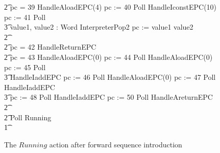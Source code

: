 \begin{figure}[tp!]
{\begin{circus}
    \t2 {} \circelse pc = 39 \circthen HandleAloadEPC(4) \circseq pc := 40 \circseq Poll \circseq HandleIconstEPC(10) \circseq  pc := 41 \circseq Poll \circseq \\
    \t3 \circvar value1, value2 : Word \circspot InterpreterPop2 \circseq pc := \IF value1 \leq value2   \\
    \t2 {} \cdots {} \\
    \t2 {} \circelse pc = 42 \circthen HandleReturnEPC \\
    \t2 {} \circelse pc = 43 \circthen HandleAloadEPC(0) \circseq pc := 44 \circseq Poll \circseq HandleAloadEPC(0) \circseq pc := 45 \circseq Poll \circseq \\
    \t3 HandleIaddEPC \circseq pc := 46 \circseq Poll \circseq HandleAloadEPC(0) \circseq pc := 47 \circseq Poll \circseq  HandleIaddEPC \circseq \\
    \t3 pc := 48 \circseq Poll \circseq HandleIaddEPC \circseq pc := 50 \circseq Poll \circseq HandleAreturnEPC \\
    \t2 {} \cdots {} \\
    \t2 \circfi \circseq Poll \circseq Running \\
    \t1 \circfi
  \end{circus}
  }
  \caption{The $Running$ action after forward sequence introduction}
  \label{forward-sequence-introduction-example-figure}
\end{figure}

